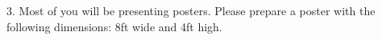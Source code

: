  3. Most of you will be presenting posters. Please prepare a poster with the following dimensions: 8ft wide and 4ft high.
